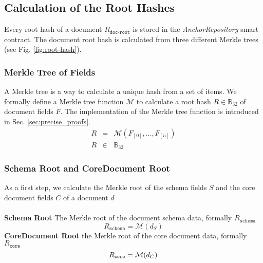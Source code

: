 \subsection{Calculation of the Root Hashes}
Every root hash of a document $R_{\texttt{doc-root}}$ is stored in the
\textit{AnchorRepository} smart contract. The document root hash is calculated from three different Merkle trees (see Fig. \ref{fig:root-hash}). 
\subsubsection{Merkle Tree of Fields}
A Merkle tree is a way to calculate a unique hash from a set of items. We formally define a Merkle tree function $\mathcal{M}$ to calculate a root hash $R \in \mathbb{B}_{32}$ of document fields $F$. The implementation of the Merkle tree function is introduced in Sec. \ref{sec:precise_proofs}.
 \begin{eqnarray}
 R & = &\mathcal{M}(F_{[0]},...,F_{[n]}) \\
 R & \in & \mathbb{B}_{32}
\end{eqnarray}
\newline
\subsubsection{Schema Root and CoreDocument Root}
As a first step, we calculate the Merkle root of the schema fields $S$ and the core document fields $C$ of a document $d$\\\\
\textbf{Schema Root} The Merkle root of the document schema data, formally $R_{{\texttt{schema}}}$ 
\newline
\begin{equation}
    R_{{\texttt{schema}}} = \mathcal{M}(d_S)
\end{equation}
\newline
\textbf{CoreDocument Root} the Merkle root of the core document data, formally $R_{{\texttt{core}}}$ \\
\begin{equation}
R_\texttt{core} = \mathcal{M}(d_C)\\
\end{equation}
